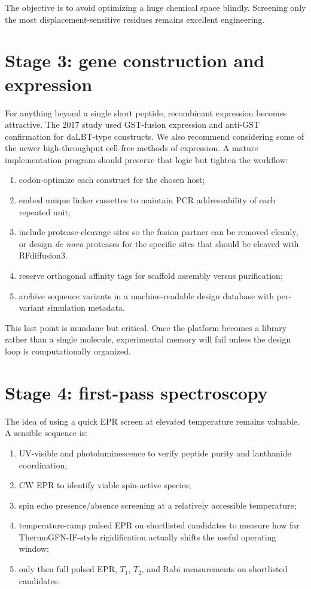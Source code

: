 \documentclass[11pt]{report}
\newcommand{\dalbt}{daLBT}
\theoremstyle{definition}
\begin{document}
The objective is to avoid optimizing a huge chemical space blindly. Screening only the most displacement-sensitive residues remains excellent engineering.

\section{Stage 3: gene construction and expression}
For anything beyond a single short peptide, recombinant expression becomes attractive. The 2017 study used GST-fusion expression and anti-GST confirmation for \dalbt{}-type constructs. We also recommend considering some of the newer high-throughput cell-free methods of expression. A mature implementation program should preserve that logic but tighten the workflow:

\begin{enumerate}[leftmargin=2em]
\item codon-optimize each construct for the chosen host;
\item embed unique linker cassettes to maintain PCR addressability of each repeated unit;
\item include protease-cleavage sites so the fusion partner can be removed cleanly, or design \emph{de novo} proteases for the specific sites that should be cleaved with RFdiffusion3. 
\item reserve orthogonal affinity tags for scaffold assembly versus purification;
\item archive sequence variants in a machine-readable design database with per-variant simulation metadata.
\end{enumerate}

This last point is mundane but critical. Once the platform becomes a library rather than a single molecule, experimental memory will fail unless the design loop is computationally organized.

\section{Stage 4: first-pass spectroscopy}
The idea of using a quick EPR screen at elevated temperature remains valuable. A sensible sequence is:

\begin{enumerate}[leftmargin=2em]
\item UV-visible and photoluminescence to verify peptide purity and lanthanide coordination;
\item CW EPR to identify viable spin-active species;
\item spin echo presence/absence screening at a relatively accessible temperature;
\item temperature-ramp pulsed EPR on shortlisted candidates to measure how far ThermoGFN-IF-style rigidification actually shifts the useful operating window;
\item only then full pulsed EPR, $T_1$, $T_2$, and Rabi measurements on shortlisted candidates.
\end{enumerate}
\end{document}
